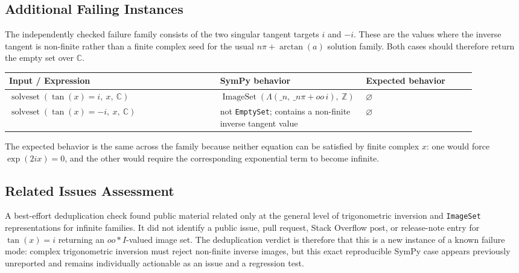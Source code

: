 \documentclass[11pt]{article}
\begin{document}
\subsection{Additional Failing Instances}

The independently checked failure family consists of the two singular tangent
targets \(i\) and \(-i\). These are the values where the inverse tangent is
non-finite rather than a finite complex seed for the usual \(n\pi+\arctan(a)\)
solution family. Both cases should therefore return the empty set over
\(\mathbb{C}\).

\begin{center}
\small
\renewcommand{\arraystretch}{1.3}
\begin{tabular}{@{}>{\raggedright\arraybackslash}p{0.44\linewidth}>{\raggedright\arraybackslash}p{0.23\linewidth}>{\raggedright\arraybackslash}p{0.23\linewidth}@{}}
\toprule
\textbf{Input / Expression} & \textbf{SymPy behavior} & \textbf{Expected behavior} \\
\midrule
\(\operatorname{solveset}(\tan(x)=i,\ x,\ \mathbb{C})\) &
\(\operatorname{ImageSet}(\Lambda(\_n,\ \_n\pi+oo\,i),\ \mathbb{Z})\) &
\(\varnothing\) \\
\(\operatorname{solveset}(\tan(x)=-i,\ x,\ \mathbb{C})\) &
not \texttt{EmptySet}; contains a non-finite inverse tangent value &
\(\varnothing\) \\
\bottomrule
\end{tabular}
\end{center}

The expected behavior is the same across the family because neither equation
can be satisfied by finite complex \(x\): one would force
\(\exp(2ix)=0\), and the other would require the corresponding exponential term
to become infinite.

\subsection{Related Issues Assessment}

A best-effort deduplication check found public material related only at the
general level of trigonometric inversion and \texttt{ImageSet} representations
for infinite families. It did not identify a public issue, pull request, Stack
Overflow post, or release-note entry for \(\tan(x)=i\) returning an
\(oo*I\)-valued image set. The deduplication verdict is therefore that this is a
new instance of a known failure mode: complex trigonometric inversion must
reject non-finite inverse images, but this exact reproducible SymPy case appears
previously unreported and remains individually actionable as an issue and a
regression test.
\end{document}

